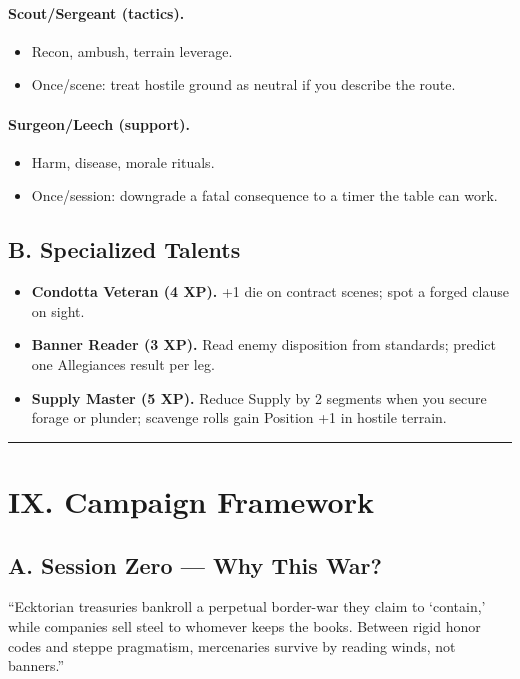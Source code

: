\documentclass[11pt]{article}
\begin{document}
\paragraph{Scout/Sergeant (tactics).}
\begin{itemize}
    \item Recon, ambush, terrain leverage.
    \item Once/scene: treat hostile ground as neutral if you describe the route.
\end{itemize}

\paragraph{Surgeon/Leech (support).}
\begin{itemize}
    \item Harm, disease, morale rituals.
    \item Once/session: downgrade a fatal consequence to a timer the table can work.
\end{itemize}

\subsection*{B. Specialized Talents}

\begin{itemize}
    \item \textbf{Condotta Veteran (4 XP).} +1 die on contract scenes; spot a forged clause on sight.
    \item \textbf{Banner Reader (3 XP).} Read enemy disposition from standards; predict one Allegiances result per leg.
    \item \textbf{Supply Master (5 XP).} Reduce Supply by 2 segments when you secure forage or plunder; scavenge rolls gain Position +1 in hostile terrain.
\end{itemize}

\rule{\textwidth}{0.4pt}

\section*{IX. Campaign Framework}

\subsection*{A. Session Zero --- Why This War?}

``Ecktorian treasuries bankroll a perpetual border-war they claim to `contain,' while companies sell steel to whomever keeps the books. Between rigid honor codes and steppe pragmatism, mercenaries survive by reading winds, not banners.''
\end{document}
